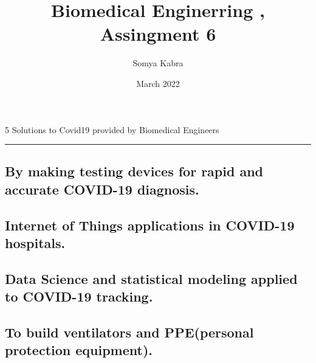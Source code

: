 \documentclass[12pt, letterpaper]{article}
\title{Biomedical Enginerring , Assingment 6}
\author{Somya Kabra }
\date{March 2022}
\begin{document}
\maketitle
\begin{center}
\huge{5 Solutions to Covid19 provided by Biomedical Engineers}
\end{center}
\rule{\textwidth}{0.5pt}
\subsection{By making testing devices for rapid and accurate COVID-19 diagnosis.}
\subsection{Internet of Things applications in COVID-19 hospitals.}


\subsection{Data Science and statistical modeling applied to COVID-19 tracking.}


\subsection{To build ventilators and PPE(personal protection equipment).}
\end{document}
